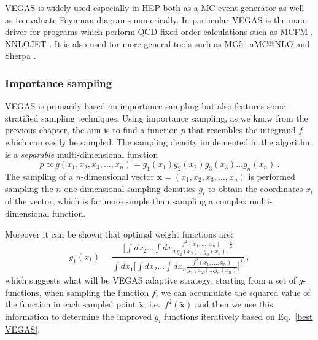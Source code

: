 \documentclass[../main/main.tex]{subfiles}
\begin{document}
VEGAS is widely used especially in HEP both as a MC event generator as well as to evaluate Feynman diagrams numerically.
In particular VEGAS is the main driver for programs which perform QCD fixed-order calculations such as MCFM \cite{Campbell:2015qma, Campbell:2019dru}, NNLOJET \cite{Gehrmann:2018szu}. It is also used for more general tools such as MG5\_aMC@NLO \cite{Alwall:2014hca} and Sherpa \cite{Gleisberg:2008ta}.
 
\subsubsection{Importance sampling}
VEGAS is primarily based on importance sampling but also features some stratified sampling techniques.
Using importance sampling, as we know from the previous chapter, the aim is to find a function $p$  that resembles the integrand $f$ which can easily be sampled. The sampling density implemented in the algorithm is a \emph{separable} multi-dimensional function
\begin{equation}
	p \propto g(x_1,x_2,x_3,\dots,x_n) = g_1(x_1)g_2(x_2)g_3(x_3)\dots g_n(x_n) \ .
\end{equation}
The sampling of a $n$-dimensional vector $\textbf{x}=(x_1,x_2,x_3,\dots,x_n)$ is performed sampling the $n$-one dimensional sampling densities
$g_i$ to obtain the coordinates $x_i$ of the vector, which is far more simple than sampling a complex multi-dimensional function.

Moreover it can be shown \cite{Lepage:1977sw, Press:1989vk} that optimal weight functions are:
\begin{equation}
	\label{best VEGAS}
	 g_1(x_1) = \frac{\displaystyle \bigg[ \int dx_2 \dots \int dx_n \frac{f^2(x_1,\dots,x_n)}{g_2(x_2)\dots g_n(x_n) }\bigg]^\frac{1}{2}} { \displaystyle
	 	\int dx_1\bigg[ \int dx_2 \dots \int dx_n \frac{f^2(x_1,\dots,x_n)}{g_2(x_2)\dots g_n(x_n) }\bigg]^\frac{1}{2}} \ ,
\end{equation}
which suggests what will be VEGAS adaptive strategy: starting from a set of $g$-functions, when sampling the function $f$,  we can accumulate the
squared value of the function in each sampled point $\tilde{\textbf{x}}$, i.e.\ $f^2(\tilde{\textbf{x}})$  and then we use this information 
to determine  the improved  $g_i$  functions iteratively based on Eq.~\ref{best VEGAS}.
\end{document}
